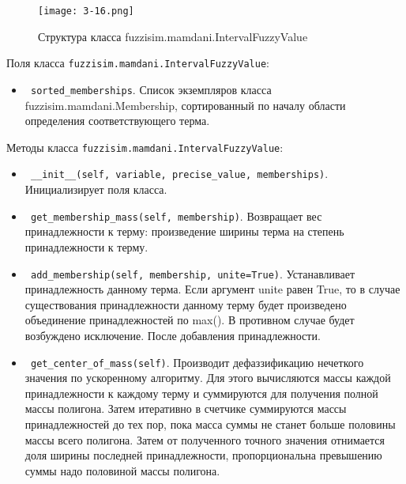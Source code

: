\begin{figure}[ht]
	\centering
	\texttt{[image: 3-16.png]}
	\caption{ Структура класса fuzzisim.mamdani.IntervalFuzzyValue}
\end{figure}

Поля класса \lstinline!fuzzisim.mamdani.IntervalFuzzyValue!:
\begin{itemize}
	\item \lstinline! sorted_memberships!. Список экземпляров класса   fuzzisim.mamdani.Membership, сортированный по началу области определения соответствующего терма.
\end{itemize}


Методы класса \lstinline!fuzzisim.mamdani.IntervalFuzzyValue!:
\begin{itemize}
	\item \lstinline! __init__(self, variable, precise_value, memberships)!. Инициализирует поля класса.
	\item \lstinline! get_membership_mass(self, membership)!. Возвращает вес принадлежности к терму: произведение ширины терма на степень принадлежности к терму.
	\item \lstinline! add_membership(self, membership, unite=True)!. Устанавливает принадлежность данному терма. Если аргумент unite равен True, то в случае существования принадлежности данному терму будет произведено объединение принадлежностей по max(). В противном случае будет возбуждено исключение. После добавления принадлежности.
	\item \lstinline! get_center_of_mass(self)!. Производит дефаззификацию нечеткого значения по ускоренному алгоритму. Для этого вычисляются массы каждой принадлежности к каждому терму и суммируются для получения полной массы полигона. Затем итеративно в счетчике суммируются массы принадлежностей до тех пор, пока масса суммы не станет больше половины массы всего полигона. Затем от полученного точного значения отнимается доля ширины последней принадлежности, пропорциональна превышению суммы надо половиной массы полигона.
\end{itemize}

